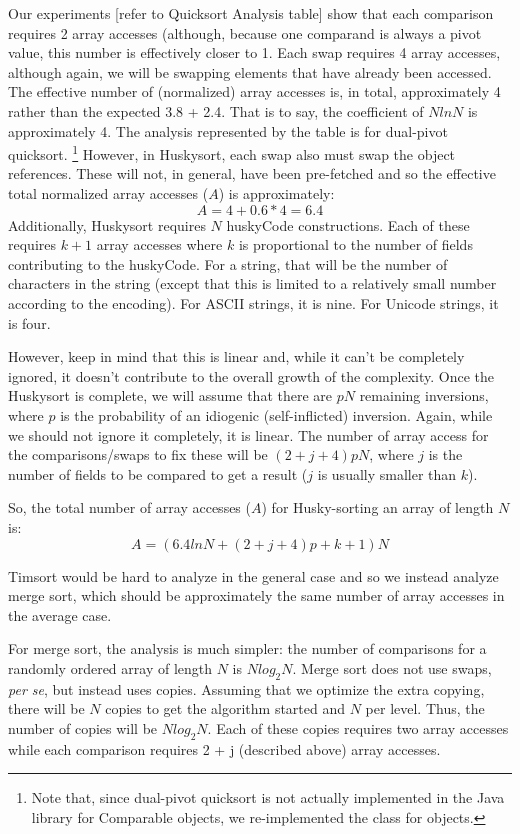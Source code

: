 \documentclass[acmtog]{acmart}
\begin{document}
Our experiments [refer to Quicksort Analysis table] show that each comparison requires 2 array accesses (although, because one comparand is always a pivot value, this number is effectively closer to 1.
Each swap requires 4 array accesses, although again, we will be swapping elements that have already been accessed.
The effective number of (normalized) array accesses is, in total, approximately 4 rather than the expected 3.8 + 2.4.
That is to say, the coefficient of $N ln N$ is approximately 4.
The analysis represented by the table is for dual-pivot quicksort.
\footnote{Note that, since dual-pivot quicksort is not actually implemented in the Java library for Comparable objects, we re-implemented the class for objects.}
However, in Huskysort, each swap also must swap the object references.
These will not, in general, have been pre-fetched and so the effective total normalized array accesses ($A$) is approximately:
\[A = 4 + 0.6 * 4 = 6.4\]
Additionally, Huskysort requires $N$ huskyCode constructions.
Each of these requires $k+1$ array accesses where $k$ is proportional to the number of fields contributing to the huskyCode.
For a string, that will be the number of characters in the string (except that this is limited to a relatively small number according to the encoding).
For ASCII strings, it is nine.
For Unicode strings, it is four.

However, keep in mind that this is linear and, while it can’t be completely ignored, it doesn't contribute to the overall growth of the complexity.
Once the Huskysort is complete, we will assume that there are $p N$ remaining inversions, where $p$ is the probability of an idiogenic (self-inflicted) inversion.
Again, while we should not ignore it completely, it is linear.
The number of array access for the comparisons/swaps to fix these will be $(2 + j + 4) p N$, where $j$ is the number of fields to be compared to get a result ($j$ is usually smaller than $k$).

So, the total number of array accesses ($A$) for Husky-sorting an array of length $N$ is:
\[A = (6.4 ln N + (2 + j + 4) p + k + 1) N\]
   
Timsort would be hard to analyze in the general case and so we instead analyze merge sort, which should be approximately the same number of array accesses in the average case.
 
For merge sort, the analysis is much simpler: the number of comparisons for a randomly ordered array of length $N$ is $N log_2 N$.
Merge sort does not use swaps, \emph{per se}, but instead uses copies.
Assuming that we optimize the extra copying, there will be $N$ copies to get the algorithm started and $N$ per level.
Thus, the number of copies will be $N {log_2 N}$.
Each of these copies requires two array accesses while each comparison requires 2 + j (described above) array accesses.
 
\end{document}
